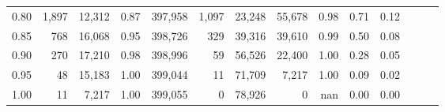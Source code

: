 \begin{tabular}{rrrrrrrrrrrrrr}
0.80 &   1,897 &  12,312 &  0.87 &  397,958 &    1,097 &  23,248 &  55,678 &  0.98 &  0.71 &      0.12 \\
0.85 &     768 &  16,068 &  0.95 &  398,726 &      329 &  39,316 &  39,610 &  0.99 &  0.50 &      0.08 \\
0.90 &     270 &  17,210 &  0.98 &  398,996 &       59 &  56,526 &  22,400 &  1.00 &  0.28 &      0.05 \\
0.95 &      48 &  15,183 &  1.00 &  399,044 &       11 &  71,709 &   7,217 &  1.00 &  0.09 &      0.02 \\
1.00 &      11 &   7,217 &  1.00 &  399,055 &        0 &  78,926 &       0 &   nan &  0.00 &      0.00 \\
\bottomrule
\end{tabular}
